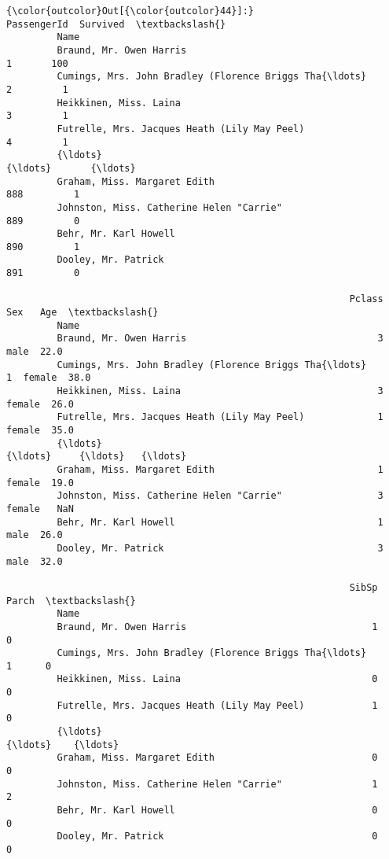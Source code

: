 \documentclass[11pt]{article}
\begin{document}
\begin{Verbatim}[commandchars=\\\{\}]
{\color{outcolor}Out[{\color{outcolor}44}]:}                                                     PassengerId  Survived  \textbackslash{}
         Name                                                                        
         Braund, Mr. Owen Harris                                       1       100   
         Cumings, Mrs. John Bradley (Florence Briggs Tha{\ldots}            2         1   
         Heikkinen, Miss. Laina                                        3         1   
         Futrelle, Mrs. Jacques Heath (Lily May Peel)                  4         1   
         {\ldots}                                                         {\ldots}       {\ldots}   
         Graham, Miss. Margaret Edith                                888         1   
         Johnston, Miss. Catherine Helen "Carrie"                    889         0   
         Behr, Mr. Karl Howell                                       890         1   
         Dooley, Mr. Patrick                                         891         0   
         
                                                             Pclass     Sex   Age  \textbackslash{}
         Name                                                                       
         Braund, Mr. Owen Harris                                  3    male  22.0   
         Cumings, Mrs. John Bradley (Florence Briggs Tha{\ldots}       1  female  38.0   
         Heikkinen, Miss. Laina                                   3  female  26.0   
         Futrelle, Mrs. Jacques Heath (Lily May Peel)             1  female  35.0   
         {\ldots}                                                    {\ldots}     {\ldots}   {\ldots}   
         Graham, Miss. Margaret Edith                             1  female  19.0   
         Johnston, Miss. Catherine Helen "Carrie"                 3  female   NaN   
         Behr, Mr. Karl Howell                                    1    male  26.0   
         Dooley, Mr. Patrick                                      3    male  32.0   
         
                                                             SibSp  Parch  \textbackslash{}
         Name                                                               
         Braund, Mr. Owen Harris                                 1      0   
         Cumings, Mrs. John Bradley (Florence Briggs Tha{\ldots}      1      0   
         Heikkinen, Miss. Laina                                  0      0   
         Futrelle, Mrs. Jacques Heath (Lily May Peel)            1      0   
         {\ldots}                                                   {\ldots}    {\ldots}   
         Graham, Miss. Margaret Edith                            0      0   
         Johnston, Miss. Catherine Helen "Carrie"                1      2   
         Behr, Mr. Karl Howell                                   0      0   
         Dooley, Mr. Patrick                                     0      0   
         

\end{Verbatim}
\end{document}
